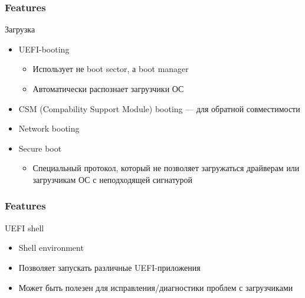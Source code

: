 \documentclass{beamer}
\begin{document}
\begin{frame}\frametitle{Features}
Загрузка
\begin{itemize}
    \item UEFI-booting
    \begin{itemize}
        \item Использует не boot sector, а boot manager
        \item Автоматически распознает загрузчики ОС
    \end{itemize}
    \item CSM (Compability Support Module) booting --- для обратной совместимости 
    \item Network booting
    \item Secure boot
    \begin{itemize}
        \item Специальный протокол, который не позволяет загружаться драйверам или загрузчикам ОС с неподходящей сигнатурой
    \end{itemize}
\end{itemize}
\end{frame}

\begin{frame}\frametitle{Features}
UEFI shell
\begin{itemize}
    \item Shell environment
    \item Позволяет запускать различные UEFI-приложения
    \item Может быть полезен для исправления/диагностики проблем с загрузчиками
\end{itemize}
\end{frame}
\end{document}
